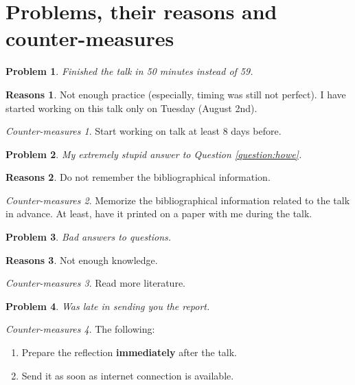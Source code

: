 \documentclass[12pt]{article} %
\theoremstyle{theorem}
\newtheorem{problem}{Problem}
\theoremstyle{definition}
\newtheorem{reason}{Reasons}
\theoremstyle{remark}
\newtheorem{countermeasure}{Counter-measures}
\begin{document}
\section{Problems, their reasons and counter-measures}
\begin{problem}
	Finished the talk in 50 minutes instead of 59.
\end{problem}
\begin{reason}
	Not enough practice (especially, timing was still not perfect).
	I have started working on this talk only on Tuesday (August 2nd).
\end{reason}
\begin{countermeasure}
	Start working on talk at least 8 days before.
\end{countermeasure}

\begin{problem}
	My extremely stupid answer to Question \ref{question:howe}.
\end{problem}
\begin{reason}
	Do not remember the bibliographical information.
\end{reason}
\begin{countermeasure}
	Memorize the bibliographical information related to the talk in advance.
	At least, have it printed on a paper with me during the talk.
\end{countermeasure}

\begin{problem}
	Bad answers to questions.
\end{problem}
\begin{reason}
	Not enough knowledge.
\end{reason}
\begin{countermeasure}
	Read more literature.
\end{countermeasure}

\begin{problem}
	Was late in sending you the report.
\end{problem}
\begin{countermeasure}The following:
	\begin{enumerate}
		\item Prepare the reflection {\bf immediately} after the talk.
		\item Send it as soon as internet connection is available.
	\end{enumerate}
\end{countermeasure}

\end{document}
